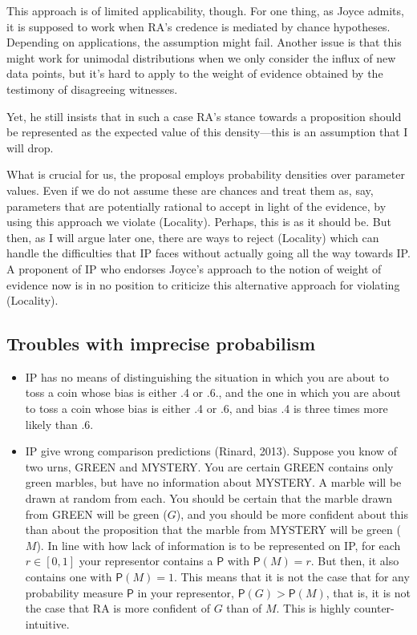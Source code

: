 \documentclass[
  10pt,
  dvipsnames,enabledeprecatedfontcommands]{scrartcl}
\newcommand{\pr}[1]{\mathsf{P}(#1)}
\begin{document}
This approach is of limited applicability, though. For one thing, as
Joyce admits, it is supposed to work when RA's credence is mediated by
chance hypotheses. Depending on applications, the assumption might fail.
Another issue is that this might work for unimodal distributions when we
only consider the influx of new data points, but it's hard to apply to
the weight of evidence obtained by the testimony of disagreeing
witnesses.

Yet, he still insists that in such a case RA's stance towards a
proposition should be represented as the expected value of this
density---this is an assumption that I will drop.

What is crucial for us, the proposal employs probability densities over
parameter values. Even if we do not assume these are chances and treat
them as, say, parameters that are potentially rational to accept in
light of the evidence, by using this approach we violate (Locality).
Perhaps, this is as it should be. But then, as I will argue later one,
there are ways to reject (Locality) which can handle the difficulties
that IP faces without actually going all the way towards IP. A proponent
of IP who endorses Joyce's approach to the notion of weight of evidence
now is in no position to criticize this alternative approach for
violating (Locality).

\hypertarget{troubles-with-imprecise-probabilism}{%
\subsection{Troubles with imprecise
probabilism}\label{troubles-with-imprecise-probabilism}}

\begin{itemize}
\item
  \textsf{IP} has no means of distinguishing the situation in which you
  are about to toss a coin whose bias is either .4 or .6., and the one
  in which you are about to toss a coin whose bias is either .4 or .6,
  and bias .4 is three times more likely than .6.
\item
  \textsf{IP} give wrong comparison predictions (Rinard, 2013). Suppose
  you know of two urns, \textsf{GREEN} and \textsf{MYSTERY}. You are
  certain \textsf{GREEN} contains only green marbles, but have no
  information about \textsf{MYSTERY}. A marble will be drawn at random
  from each. You should be certain that the marble drawn from
  \textsf{GREEN} will be green (\(G\)), and you should be more confident
  about this than about the proposition that the marble from
  \textsf{MYSTERY} will be green (\(M\)). In line with how lack of
  information is to be represented on \textsf{IP}, for each
  \(r\in [0,1]\) your representor contains a \(\mathsf{P}\) with
  \(\pr{M}=r\). But then, it also contains one with \(\pr{M}=1\). This
  means that it is not the case that for any probability measure
  \(\mathsf{P}\) in your representor, \(\mathsf{P}(G) > \mathsf{P}(M)\),
  that is, it is not the case that RA is more confident of \(G\) than of
  \(M\). This is highly counter-intuitive.
\end{itemize}
\end{document}
